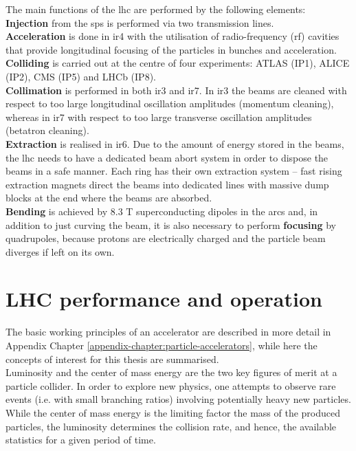 \documentclass[encoding=utf8,british]{tumphthesis}
\begin{document}
The main functions of the \acrshort{lhc} are performed by the following elements: \\
\textbf{Injection} from the \acrshort{sps} is performed via two transmission lines.\\ 
\textbf{Acceleration} is done in \acrshort{ir}4 with the utilisation of radio-frequency (\acrshort{rf}) cavities that provide longitudinal focusing of the particles in bunches and acceleration. \\
\textbf{Colliding} is carried out at the centre of four experiments: ATLAS (IP1), ALICE (IP2), CMS (IP5) and LHCb (IP8). \\ 
\textbf{Collimation} is performed in both \acrshort{ir}3 and \acrshort{ir}7. In \acrshort{ir}3 the beams are cleaned with respect to too large longitudinal oscillation amplitudes (momentum cleaning), whereas in \acrshort{ir}7 with respect to too large transverse oscillation amplitudes (betatron cleaning).\\
\textbf{Extraction} is realised in \acrshort{ir}6. Due to the amount of energy stored in the beams, the \acrshort{lhc} needs to have a dedicated beam abort system in order to dispose the beams in a safe manner. Each ring has their own extraction system – fast rising extraction magnets direct the beams into dedicated lines with massive dump blocks at the end where the beams are absorbed.\\
\textbf{Bending} is achieved by 8.3 T superconducting dipoles in the arcs and, in addition to just curving the beam, it is also necessary to perform \textbf{focusing} by quadrupoles, because protons are electrically charged and the particle beam diverges if left on its own.

\section{LHC performance and operation}
\label{section:LHC-operational-cycle}

The basic working principles of an accelerator are described in more detail in Appendix Chapter \ref{appendix-chapter:particle-accelerators}, while here the concepts of interest for this thesis are summarised. \\

Luminosity and the center of mass energy are the two key figures of merit at a particle collider. In order to explore new physics, one attempts to observe rare events (i.e. with small branching ratios) involving potentially heavy new particles. While the center of mass energy is the limiting factor the mass of the produced particles, the luminosity determines the collision rate, and hence, the available statistics for a given period of time.
\end{document}

